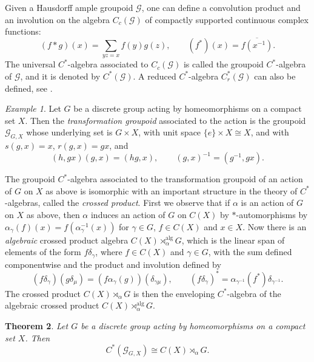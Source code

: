 \documentclass[11pt]{amsart}
\def\ol{\overline}
\newcommand{\alrtimes}{\rtimes^{\mathrm{alg}}}
\theoremstyle{plain}            %
\newtheorem{theorem}{Theorem}[section]
\theoremstyle{definition}       %
\theoremstyle{definition}       %
\theoremstyle{remark}
\newtheorem{example}[theorem]{Example}
\begin{document}
Given a Hausdorff ample groupoid $\mathcal G$, one can define a convolution product and an involution on the algebra $C_c(\mathcal G)$ of compactly supported continuous complex functions:
$$(f \ast g ) (x)= \sum_{yz=x} f(y)g(z),\qquad (f^*)(x) = \ol{f(x^{-1})}.$$ The universal $C^*$-algebra associated to $C_c(\mathcal G)$ is called the groupoid $C^*$-algebra of $\mathcal G$, and it is denoted by $C^*(\mathcal G)$. A reduced $C^*$-algebra $C_r^* (\mathcal G)$ can also be defined, see \cite{SimsCRMNotes}.

\begin{example}
	\label{exam:transformation-groupoid}
	Let $G$ be a discrete group acting by homeomorphisms on a compact set $X$. Then the {\it transformation groupoid} associated to the action is the groupoid 
	$\mathcal G _{G,X}$ whose underlying set is  $G\times X$, with unit space $\{e\}\times X\cong X$, and with  $s(g,x) = x$, $r(g,x)= gx$, and
	$$(h,gx) (g,x) = (hg,x),\qquad (g,x)^{-1} = (g^{-1}, gx) .$$
\end{example}

The groupoid $C^*$-algebra associated to the transformation groupoid of an action of $G$ on $X$ as above is isomorphic with an important structure in the theory of $C^*$-algebras, called the {\it crossed product}.
First we observe that if $\alpha$ is an action of $G$ on $X$ as above, then $\alpha$ induces an action of $G$ on $C(X)$ by $*$-automorphisms by $\alpha_\gamma (f)(x)= f(\alpha_\gamma^{-1}(x))$ for $\gamma\in G$, $f\in C(X)$ and $x\in X$. 
Now  there is an {\it algebraic} crossed product algebra $C(X)\alrtimes_\alpha G$, which is the linear span of elements of the form $f\delta_\gamma$, where $f\in C(X)$ and $\gamma \in G$, with the sum defined componentwise and the product and involution defined by
\begin{equation}
	\label{eq:crossedprod-operations}
	(f\delta_\gamma )(g\delta_\mu) = (f\alpha_\gamma (g)) (\delta _{\gamma \mu}),\qquad (f\delta_\gamma)^* = \alpha_{\gamma^{-1}} (f^*)\delta_{\gamma^{-1}}.
\end{equation}
The crossed product $C(X)\rtimes_{\alpha} G$ is then the enveloping $C^*$-algebra of the algebraic crossed product  $C(X)\alrtimes _{\alpha} G$. 

\begin{theorem}
	\label{thm:cross-product}
	Let $G$ be a discrete group acting by homeomorphisms on a compact set $X$. Then 
	$$C^*(\mathcal G_{G,X}) \cong C(X)\rtimes_\alpha G.$$
\end{theorem}
\end{document}
